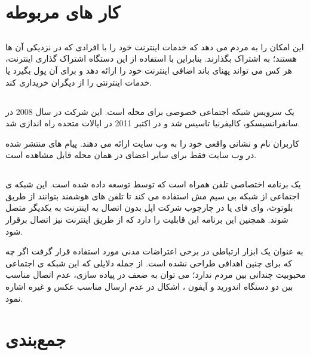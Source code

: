\section{کار های مربوطه}
\subsection{}
 \href{https://www.opengarden.com}{}%
این امکان را به مردم می دهد که  خدمات اینترنت خود را با افرادی که در نزدیکی آن ها هستند؛ به اشتراک بگذارند. بنابراین با استفاده از این دستگاه اشتراک گذاری اینترنت، هر کس می تواند پهنای باند اضافی اینترنت خود را ارائه دهد و برای آن پول بگیرد یا خدمات اینترنتی را از دیگران خریداری کند.

\subsection{} 
  \href{https://nextdoor.com/}{}%
یک سرویس شبکه اجتماعی خصوصی برای محله است. این شرکت در سال 2008 در سانفرانسیسکو، کالیفرنیا تاسیس شد و در اکتبر 2011 در ایالات متحده راه اندازی شد.

کاربران 
نام و نشانی واقعی خود را به وب سایت ارائه می دهند. پیام های منتشر شده در وب سایت فقط برای سایر اعضای  
در همان محله قابل مشاهده است.
\subsection{}
 \href{https://www.opengarden.com/firechat/}{}%
یک برنامه اختصاصی تلفن همراه است که توسط
توسعه داده شده است. این شبکه ی اجتماعی از شبکه بی سیم مش استفاده می کند تا تلفن های هوشمند بتوانند از طریق بلوتوث، وای فای یا در چارچوب
شرکت اپل بدون اتصال به اینترنت به یکدیگر متصل شوند. همچنین این برنامه این قابلیت را دارد که از طریق اینترنت نیز اتصال برقرار شود.

به عنوان یک ابزار ارتباطی در برخی اعتراضات مدنی مورد استفاده قرار گرفت اگر چه که برای چنین اهدافی طراحی نشده است. از جمله دلایلی که این شبکه ی اجتماعی محبوبیت چندانی بین مردم ندارد؛ می توان به ضعف در پیاده سازی، عدم اتصال مناسب بین دو دستگاه اندورید
و آیفون
، اشکال در عدم ارسال مناسب عکس و غیره اشاره نمود.
\subsection{}    
  
\section{جمع‌بندی}
